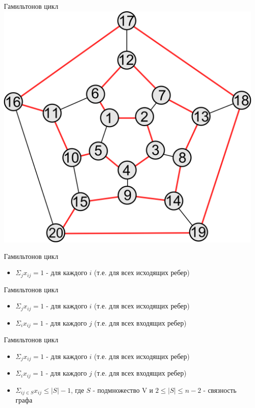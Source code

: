 \documentclass{beamer}
\begin{document}
\begin{frame}{Гамильтонов цикл}
\includegraphics[scale=0.4]{Hamiltonial.png}
\end{frame}

\begin{frame}{Гамильтонов цикл}
\begin{itemize}
\item $\Sigma_{j} x_{ij} = 1$ - для каждого $i$ (т.е. для всех исходящих ребер)
\end{itemize}
\end{frame}

\begin{frame}{Гамильтонов цикл}
\begin{itemize}
\item $\Sigma_{j} x_{ij} = 1$ - для каждого $i$ (т.е. для всех исходящих ребер)
\item $\Sigma_{i} x_{ij} = 1$ - для каждого $j$ (т.е. для всех входящих ребер)
\end{itemize}
\end{frame}

\begin{frame}{Гамильтонов цикл}
\begin{itemize}
\item $\Sigma_{j} x_{ij} = 1$ - для каждого $i$ (т.е. для всех исходящих ребер)
\item $\Sigma_{i} x_{ij} = 1$ - для каждого $j$ (т.е. для всех входящих ребер)
\item $\Sigma_{ij \in S} x_{ij} \le |S| - 1$, где $S$ - подмножество V и $2 \le |S| \le n - 2$ - связность графа
\end{itemize}
\end{frame}
\end{document}
